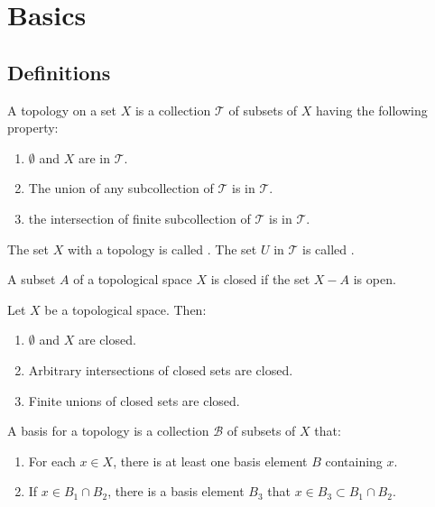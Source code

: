 \section{Basics}

\subsection{Definitions}

\begin{definition}
    A topology on a set $X$ is a collection $\mathcal{T}$ of subsets of $X$ having the following property:
    \begin{enumerate}
        \item $\emptyset$ and $X$ are in $\mathcal{T}$.
        \item The union of any subcollection of $\mathcal{T}$ is in $\mathcal{T}$.
        \item the intersection of finite subcollection of $\mathcal{T}$ is in $\mathcal{T}$.
    \end{enumerate}

The set $X$ with a topology is called . The set $U$ in $\mathcal{T}$ is called .
\end{definition}

\begin{definition}
    A subset $A$ of a topological space $X$ is closed if the set $X - A$ is open.
\end{definition}

\begin{definition}
    Let $X$ be a topological space. Then:
    \begin{enumerate}
        \item $\emptyset$ and $X$ are closed.
        \item Arbitrary intersections of closed sets are closed.
        \item Finite unions of closed sets are closed.
    \end{enumerate}
\end{definition}

\begin{definition}
    A basis for a topology is a collection $\mathcal{B}$ of subsets of $X$ that:
    \begin{enumerate}
        \item For each $x \in X$, there is at least one basis element $B$ containing $x$.
        \item If $x \in B_1 \cap B_2$, there is a basis element $B_3$ that $x \in B_3 \subset B_1 \cap B_2$.
    \end{enumerate}
\end{definition}

